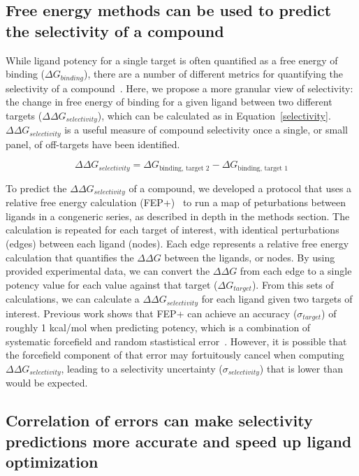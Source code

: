 \documentclass[phd,tocprelim]{cornell}
\begin{document}
\subsection{Free energy methods can be used to predict the selectivity of a compound}
While ligand potency for a single target is often quantified as a free energy of binding ($\Delta G_{binding}$), there are a number of different metrics for quantifying the selectivity of a compound~\citep{Bosc:2017gs,Cheng2010-ip}. Here, we propose a more granular view of selectivity: the change in free energy of binding for a given ligand between two different targets ($\Delta \Delta G_{selectivity}$), which can be calculated as in Equation~\ref{selectivity}. $\Delta \Delta G_{selectivity}$ is a useful measure of compound selectivity once a single, or small panel, of off-targets have been identified. 

\begin{equation}\label{selectivity}
\Delta \Delta G_{selectivity} = \Delta G_{\text{binding, target 2}} - \Delta G_{\text{binding, target 1}}
\end{equation}

To predict the $\Delta \Delta G_{selectivity}$ of a compound, we developed a protocol that uses a relative free energy calculation (FEP+)~\citep{Wang:J.Am.Chem.Soc.:2015} to run a map of peturbations between ligands in a congeneric series, as described in depth in the methods section. The calculation is repeated for each target of interest, with identical perturbations (edges) between each ligand (nodes). Each edge represents a relative free energy calculation that quantifies the $\Delta \Delta G$ between the ligands, or nodes. By using provided experimental data, we can convert the $\Delta \Delta G$ from each edge to a single potency value for each value against that target ($\Delta G_{target}$). From this sets of calculations, we can calculate a $\Delta \Delta G_{selectivity}$ for each ligand given two targets of interest. Previous work shows that FEP+ can achieve an accuracy ($\sigma_{target}$) of roughly 1 kcal/mol when predicting potency, which is a combination of systematic forcefield and random stastistical error~\citep{Wang:J.Am.Chem.Soc.:2015}. However, it is possible that the forcefield component of that error may fortuitously cancel when computing $\Delta \Delta G_{selectivity}$, leading to a selectivity uncertainty ($\sigma_{selectivity}$) that is lower than would be expected. 

\subsection{Correlation of errors can make selectivity predictions more accurate and speed up ligand optimization}
\end{document}
